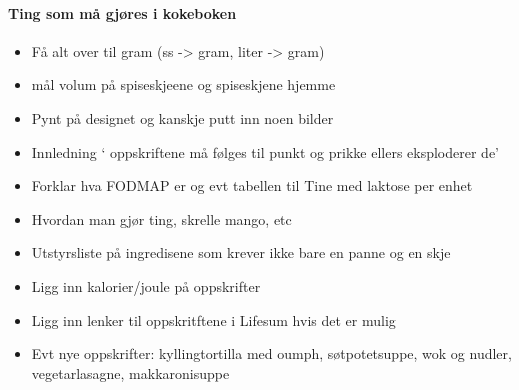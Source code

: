 
\paragraph{Ting som må gjøres i kokeboken}
\begin{itemize}[noitemsep]
  \item Få alt over til gram (ss -> gram, liter -> gram)
  \item mål volum på spiseskjeene og spiseskjene hjemme
  \item Pynt på designet og kanskje putt inn noen bilder
  \item Innledning ` oppskriftene må følges til punkt og prikke ellers eksploderer de'
  \item Forklar hva FODMAP er og evt tabellen til Tine med laktose per enhet
  \item Hvordan man gjør ting, skrelle mango, etc
  \item Utstyrsliste på ingredisene som krever ikke bare en panne og en skje
  \item Ligg inn kalorier/joule på oppskrifter
  \item Ligg inn lenker til oppskritftene i Lifesum hvis det er mulig
  \item Evt nye oppskrifter: kyllingtortilla med oumph, søtpotetsuppe, wok og nudler, vegetarlasagne, makkaronisuppe
\end{itemize}

